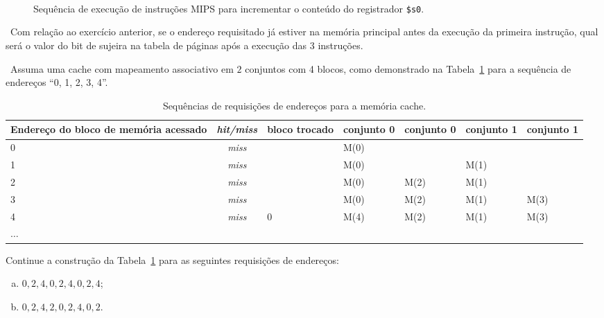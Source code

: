 \begin{figure}[h]
\centering
\begin{ganttchart}{1}{7}
 \\
\\
\\
\end{ganttchart}
\caption{Sequência de execução de instruções MIPS para incrementar o
conteúdo do registrador {\tt \$s0}.}
\label{fig:incr}
\end{figure}

\exercise~Com relação ao exercício
anterior, se o endereço requisitado já estiver na memória principal
antes da execução da primeira instrução, qual será o valor do bit de
sujeira na tabela de páginas após a execução das 3 instruções.


\exercise~Assuma uma cache com
mapeamento associativo em $2$ conjuntos com 4 blocos, como demonstrado
na Tabela~\ref{tab:miss} para a sequência de endereços ``0, 1, 2, 3, 4''.

\begin{table}[ht]
\scriptsize
\centering
\begin{tabular}[ht]{p{3cm}cp{1cm}p{1cm}p{1cm}p{1cm}p{1cm}}\hline
Endereço do bloco de memória acessado& \em hit/miss & bloco trocado &
conjunto 0 & conjunto 0 & conjunto 1 & conjunto 1\\\hline
0 & \em miss & & M(0) & & & \\
1 & \em miss & & M(0) & & M(1) & \\
2 & \em miss & & M(0) & M(2) & M(1) & \\
3 & \em miss & & M(0) & M(2) & M(1) & M(3)\\
4 & \em miss & 0 & M(4) & M(2) & M(1) & M(3)\\
$\ldots$ &  & & & & & \\\hline
\end{tabular}
\caption{Sequências de requisições de endereços para a memória cache.}
\label{tab:miss}
\end{table}

Continue a construção da Tabela~\ref{tab:miss} para as seguintes
requisições de endereços:

\begin{enumerate}[a)]
\item $0,2,4,0,2,4,0,2,4$;
\item $0,2,4,2,0,2,4,0,2$.
\end{enumerate}


